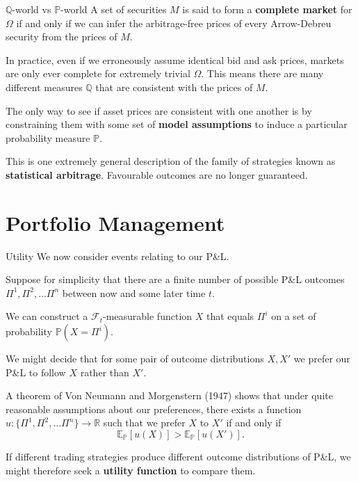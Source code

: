 \documentclass{beamer}
\begin{document}
\begin{frame}{$\mathbb{Q}$-world vs $\mathbb{P}$-world}
	A set of securities $M$ is said to form a \textbf{complete market} for $\Omega$ if and only if we can infer the arbitrage-free prices of every Arrow-Debreu security from the prices of $M$.

	In practice, even if we erroneously assume identical bid and ask prices, markets are only ever complete for extremely trivial $\Omega$. This means there are many different measures $\mathbb{Q}$ that are consistent with the prices of $M$.

	The only way to see if asset prices are consistent with one another is by constraining them with some set of \textbf{model assumptions} to induce a particular probability measure $\mathbb{P}$.

	This is one extremely general description of the family of strategies known as \textbf{statistical arbitrage}. Favourable outcomes are no longer guaranteed.
\end{frame}

\section{Portfolio Management}
\begin{frame}{Utility}
	We now consider events relating to our P\&L.

	Suppose for simplicity that there are a finite number of possible P\&L outcomes $\Pi^1,\Pi^2,\ldots\Pi^n$ between now and some later time $t$.

	We can construct a $\mathcal{F}_t$-measurable function $X$ that equals $\Pi^i$ on a set of probability $\mathbb{P}(X=\Pi^i)$.%

	We might decide that for some pair of outcome distributions $X,X'$ we prefer our P\&L to follow $X$ rather than $X'$.

	A theorem of Von Neumann and Morgenstern (1947) shows that under quite reasonable assumptions about our preferences, there exists a function $u:\{\Pi^1,\Pi^2,\ldots \Pi^n\}\to\mathbb{R}$ such that we prefer $X$ to $X'$ if and only if%
	$$\mathbb{E}_\mathbb{P}[u(X)] > \mathbb{E}_\mathbb{P}[u(X')].$$

	If different trading strategies produce different outcome distributions of P\&L, we might therefore seek a \textbf{utility function} to compare them.
\end{frame}
\end{document}
